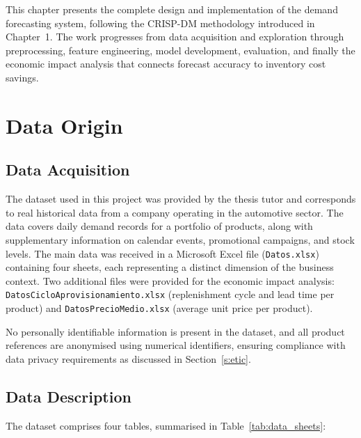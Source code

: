 
This chapter presents the complete design and implementation of the demand forecasting system, following the CRISP-DM methodology introduced in Chapter~1. The work progresses from data acquisition and exploration through preprocessing, feature engineering, model development, evaluation, and finally the economic impact analysis that connects forecast accuracy to inventory cost savings.

\section{Data Origin}

\subsection{Data Acquisition}

The dataset used in this project was provided by the thesis tutor and corresponds to real historical data from a company operating in the automotive sector. The data covers daily demand records for a portfolio of products, along with supplementary information on calendar events, promotional campaigns, and stock levels. The main data was received in a Microsoft Excel file (\texttt{Datos.xlsx}) containing four sheets, each representing a distinct dimension of the business context. Two additional files were provided for the economic impact analysis: \texttt{DatosCicloAprovisionamiento.xlsx} (replenishment cycle and lead time per product) and \texttt{DatosPrecioMedio.xlsx} (average unit price per product).

No personally identifiable information is present in the dataset, and all product references are anonymised using numerical identifiers, ensuring compliance with data privacy requirements as discussed in Section~\ref{s:etic}.

\subsection{Data Description}

The dataset comprises four tables, summarised in Table~\ref{tab:data_sheets}:

